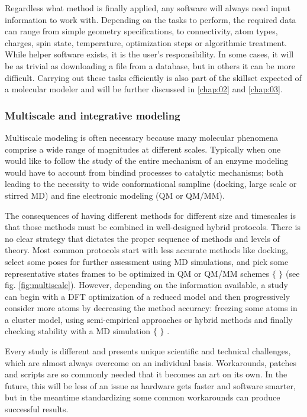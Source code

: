 Regardless what method is finally applied, any software will always need input information to work with. Depending on the tasks to perform, the required data can range from simple geometry specifications, to connectivity, atom types, charges, spin state, temperature, optimization steps or algorithmic treatment. While helper software exists, it is the user’s responsibility. In some cases, it will be as trivial as downloading a file from a database, but in others it can be more difficult. Carrying out these tasks efficiently is also part of the skillset expected of a molecular modeler and will be further discussed in \autoref{chap:02} and \autoref{chap:03}.

\subsubsection{Multiscale and integrative modeling}
%

Multiscale modeling is often necessary because many molecular phenomena comprise a wide range of magnitudes at different scales. Typically when one would like to follow the study of the entire mechanism of an enzyme modeling would have to account from bindind processes to catalytic mechanisms; both leading to the necessity to wide conformational sampline (docking, large scale or stirred MD) and fine electronic modeling (QM or QM/MM).

The consequences of having different methods for different size and timescales is that those methods must be combined in well-designed hybrid protocols. There is no clear strategy that dictates the proper sequence of methods and levels of theory. Most common protocols start with less accurate methods like docking, select some poses for further assessment using MD simulations, and pick some representative states frames to be optimized in QM or QM/MM schemes $ \{ $ $ \} $  (see fig. \ref{fig:multiscale}). However, depending on the information available, a study can begin with a DFT optimization of a reduced model and then progressively consider more atoms by decreasing the method accuracy: freezing some atoms in a cluster model, using semi-empirical approaches or hybrid methods and finally checking stability with a MD simulation $ \{ $ $ \} $ .

Every study is different and presents unique scientific and technical challenges, which are almost always overcome on an individual basis. Workarounds, patches and scripts are so commonly needed that it becomes an art on its own. In the future, this will be less of an issue as hardware gets faster and software smarter, but in the meantime standardizing some common workarounds can produce successful results.


